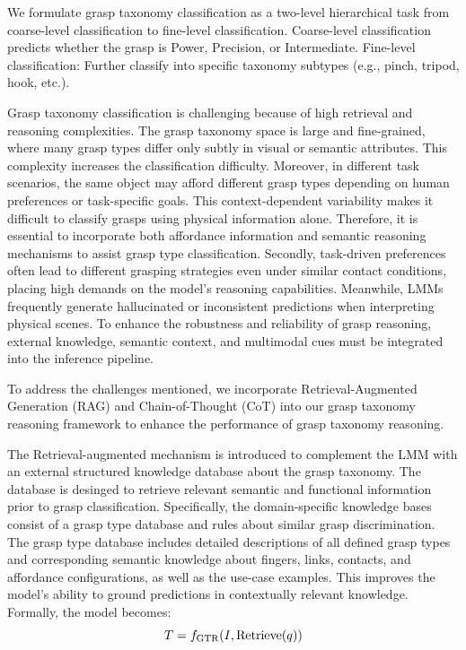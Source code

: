 We formulate grasp taxonomy classification as a two-level hierarchical task from coarse-level classification to fine-level classification. 
Coarse-level classification predicts whether the grasp is Power, Precision, or Intermediate. Fine-level classification: Further classify into specific taxonomy subtypes (e.g., pinch, tripod, hook, etc.).

Grasp taxonomy classification is challenging because of high retrieval and reasoning complexities. The grasp taxonomy space is large and fine-grained, where many grasp types differ only subtly in visual or semantic attributes. This complexity increases the classification difficulty.  Moreover, in different task scenarios, the same object may afford different grasp types depending on human preferences or task-specific goals. This context-dependent variability makes it difficult to classify grasps using physical information alone.
Therefore, it is essential to incorporate both affordance information and semantic reasoning mechanisms to assist grasp type classification. Secondly, task-driven preferences often lead to different grasping strategies even under similar contact conditions, placing high demands on the model's reasoning capabilities. Meanwhile, LMMs frequently generate hallucinated or inconsistent predictions when interpreting physical scenes. To enhance the robustness and reliability of grasp reasoning, external knowledge, semantic context, and multimodal cues must be integrated into the inference pipeline.

To address the challenges mentioned, we incorporate Retrieval-Augmented Generation (RAG) and Chain-of-Thought (CoT) into our grasp taxonomy reasoning framework to enhance the performance of grasp taxonomy reasoning.

The Retrieval-augmented mechanism is introduced to complement the LMM with an external structured knowledge database about the grasp taxonomy. The database is desinged to retrieve relevant semantic and functional information prior to grasp classification. Specifically, the domain-specific knowledge bases consist of a grasp type database and rules about similar grasp discrimination. The grasp type database includes detailed descriptions of all defined grasp types and corresponding semantic knowledge about fingers, links, contacts, and affordance configurations, as well as the use-case examples. This improves the model's ability to ground predictions in contextually relevant knowledge. 
Formally, the model becomes:
\begin{equation}
    T=f_{\rm GTR}(I,{\rm Retrieve}(q))
\end{equation}

